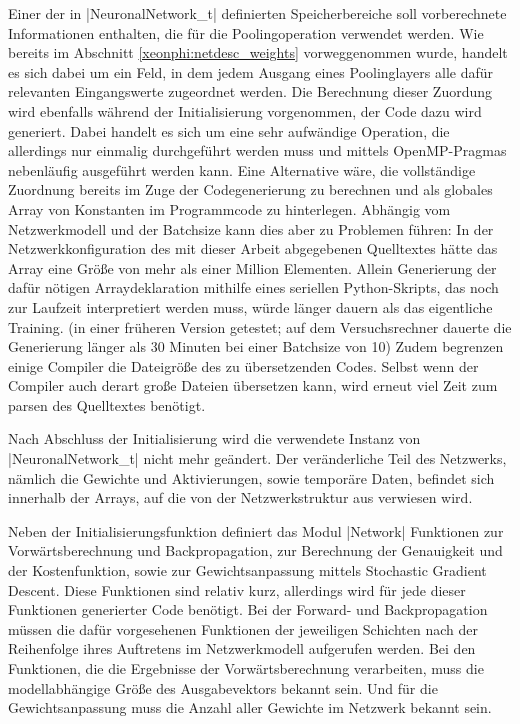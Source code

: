 \documentclass[../main.tex]{subfiles}
\begin{document}
Einer der in |NeuronalNetwork_t| definierten Speicherbereiche soll vorberechnete Informationen enthalten, die für die Poolingoperation verwendet werden. Wie bereits im Abschnitt \ref{xeonphi:netdesc_weights} vorweggenommen wurde, handelt es sich dabei um ein Feld, in dem jedem Ausgang eines Poolinglayers alle dafür relevanten Eingangswerte zugeordnet werden. Die Berechnung dieser Zuordung wird ebenfalls während der Initialisierung vorgenommen, der Code dazu wird generiert. Dabei handelt es sich um eine sehr aufwändige Operation, die allerdings nur einmalig durchgeführt werden muss und mittels OpenMP-Pragmas nebenläufig ausgeführt werden kann. Eine Alternative wäre, die vollständige Zuordnung bereits im Zuge der Codegenerierung zu berechnen und als globales Array von Konstanten im Programmcode zu hinterlegen. Abhängig vom Netzwerkmodell und der Batchsize kann dies aber zu Problemen führen: In der Netzwerkkonfiguration des mit dieser Arbeit abgegebenen Quelltextes hätte das Array eine Größe von mehr als einer Million Elementen. Allein Generierung der dafür nötigen Arraydeklaration mithilfe eines seriellen Python-Skripts, das noch zur Laufzeit interpretiert werden muss, würde länger dauern als das eigentliche Training. (in einer früheren Version getestet; auf dem Versuchsrechner dauerte die Generierung länger als 30 Minuten bei einer Batchsize von 10) Zudem begrenzen einige Compiler die Dateigröße des zu übersetzenden Codes. Selbst wenn der Compiler auch derart große Dateien übersetzen kann, wird erneut viel Zeit zum parsen des Quelltextes benötigt. 

Nach Abschluss der Initialisierung wird die verwendete Instanz von |NeuronalNetwork_t| nicht mehr geändert. Der veränderliche Teil des Netzwerks, nämlich die Gewichte und Aktivierungen, sowie temporäre Daten, befindet sich innerhalb der Arrays, auf die von der Netzwerkstruktur aus verwiesen wird. 

Neben der Initialisierungsfunktion definiert das Modul |Network| Funktionen zur Vorwärtsberechnung und Backpropagation, zur Berechnung der Genauigkeit und der Kostenfunktion, sowie zur Gewichtsanpassung mittels Stochastic Gradient Descent. Diese Funktionen sind relativ kurz, allerdings wird für jede dieser Funktionen generierter Code benötigt. Bei der Forward- und Backpropagation müssen die dafür vorgesehenen Funktionen der jeweiligen Schichten nach der Reihenfolge ihres Auftretens im Netzwerkmodell aufgerufen werden. Bei den Funktionen, die die Ergebnisse der Vorwärtsberechnung verarbeiten, muss die modellabhängige Größe des Ausgabevektors bekannt sein. Und für die Gewichtsanpassung muss die Anzahl aller Gewichte im Netzwerk bekannt sein. 
\end{document}
